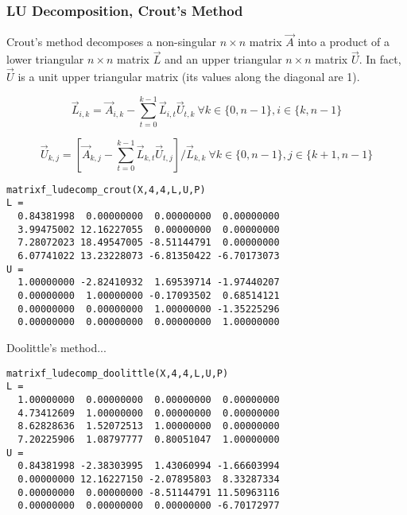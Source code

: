 \subsubsection{LU Decomposition, Crout's Method}
Crout's method decomposes a non-singular $n\times n$ matrix $\vec{A}$ into a
product of a lower triangular $n \times n$ matrix $\vec{L}$ and an upper
triangular $n \times n$ matrix $\vec{U}$. %
In fact, $\vec{U}$ is a unit upper triangular matrix (its values along the
diagonal are 1).

\[
    \vec{L}_{i,k} = \vec{A}_{i,k} -
                    \sum_{t=0}^{k-1}{ \vec{L}_{i,t} \vec{U}_{t,k} }
                    \ \forall k \in \{0,n-1\}, i \in \{k,n-1\}
\]

\[
    \vec{U}_{k,j} = \left[
                    \vec{A}_{k,j} -
                    \sum_{t=0}^{k-1}{ \vec{L}_{k,t} \vec{U}_{t,j} }
                    \right] / \vec{L}_{k,k}
                    \ \forall k \in \{0,n-1\}, j \in \{k+1,n-1\}
\]

\begin{verbatim}
matrixf_ludecomp_crout(X,4,4,L,U,P)
L =
  0.84381998  0.00000000  0.00000000  0.00000000
  3.99475002 12.16227055  0.00000000  0.00000000
  7.28072023 18.49547005 -8.51144791  0.00000000
  6.07741022 13.23228073 -6.81350422 -6.70173073
U =
  1.00000000 -2.82410932  1.69539714 -1.97440207
  0.00000000  1.00000000 -0.17093502  0.68514121
  0.00000000  0.00000000  1.00000000 -1.35225296
  0.00000000  0.00000000  0.00000000  1.00000000
\end{verbatim}

Doolittle's method...
\begin{verbatim}
matrixf_ludecomp_doolittle(X,4,4,L,U,P)
L =
  1.00000000  0.00000000  0.00000000  0.00000000
  4.73412609  1.00000000  0.00000000  0.00000000
  8.62828636  1.52072513  1.00000000  0.00000000
  7.20225906  1.08797777  0.80051047  1.00000000
U =
  0.84381998 -2.38303995  1.43060994 -1.66603994
  0.00000000 12.16227150 -2.07895803  8.33287334
  0.00000000  0.00000000 -8.51144791 11.50963116
  0.00000000  0.00000000  0.00000000 -6.70172977
\end{verbatim}

